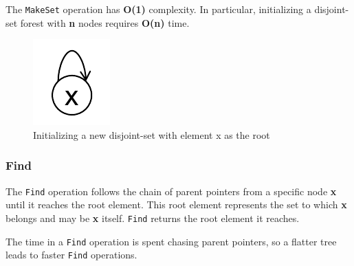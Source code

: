 \documentclass[
]{book}
\begin{document}
The \texttt{MakeSet} operation has \textbf{O(1)} complexity. In particular, initializing a disjoint-set forest with \textbf{n} nodes requires \textbf{O(n)} time.

\begin{figure}

{\centering \includegraphics{img/07-image04} 

}

\caption{Initializing a new disjoint-set with element x as the root}\label{fig:makeset}
\end{figure}

\hypertarget{find}{%
\subsubsection{Find}\label{find}}

The \texttt{Find} operation follows the chain of parent pointers from a specific node \textbf{x} until it reaches the root element. This root element represents the set to which \textbf{x} belongs and may be \textbf{x} itself. \texttt{Find} returns the root element it reaches.

The time in a \texttt{Find} operation is spent chasing parent pointers, so a flatter tree leads to faster \texttt{Find} operations.
\end{document}

